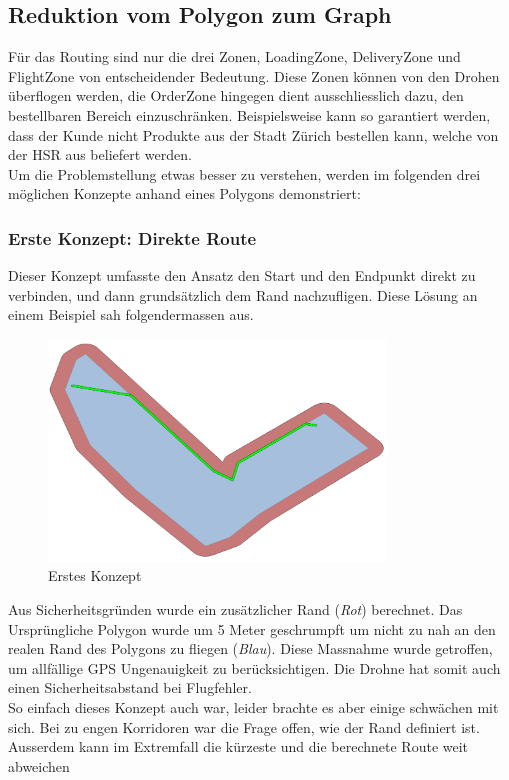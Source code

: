 \subsection{Reduktion vom Polygon zum Graph}
Für das Routing sind nur die drei Zonen, LoadingZone, DeliveryZone und FlightZone von entscheidender Bedeutung. Diese Zonen können von den Drohen überflogen werden, die OrderZone hingegen dient ausschliesslich dazu, den bestellbaren Bereich einzuschränken. Beispielsweise kann so garantiert werden, dass der Kunde nicht Produkte aus der Stadt Zürich bestellen kann, welche von der HSR aus beliefert werden.
\\
Um die Problemstellung etwas besser zu verstehen, werden im folgenden drei möglichen Konzepte anhand eines Polygons demonstriert:

\subsubsection{Erste Konzept: Direkte Route}
Dieser Konzept umfasste den Ansatz den Start und den Endpunkt direkt zu verbinden, und dann grundsätzlich dem Rand nachzufligen. Diese Lösung an einem Beispiel sah folgendermassen aus.
\begin{figure}[h]
	\centering
	\includegraphics[width=0.8\textwidth]{images/routing/firstSolution.png}
	\caption{Erstes Konzept}
	\label{fig:first-concet-routing}
\end{figure}
Aus Sicherheitsgründen wurde ein zusätzlicher Rand (\textit{Rot}) berechnet. Das Ursprüngliche Polygon wurde um 5 Meter geschrumpft um nicht zu nah an den realen Rand des Polygons zu fliegen (\textit{Blau}). Diese Massnahme wurde getroffen, um allfällige GPS Ungenauigkeit zu berücksichtigen. Die Drohne hat somit auch einen Sicherheitsabstand bei Flugfehler.
\\
So einfach dieses Konzept auch war, leider brachte es aber einige schwächen mit sich. Bei zu engen Korridoren war die Frage offen, wie der Rand definiert ist. Ausserdem kann im Extremfall die kürzeste und die berechnete Route weit abweichen 

